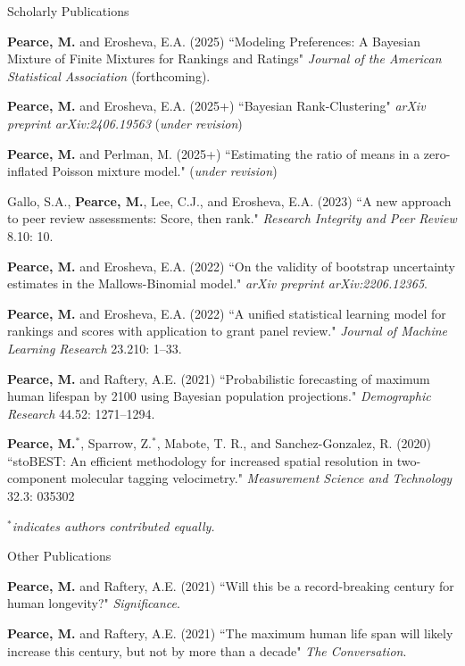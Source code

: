 \documentclass{resume} %
\begin{document}
\begin{rSection}{Scholarly Publications}

\textbf{Pearce, M.} and Erosheva, E.A. (2025) ``Modeling Preferences: A Bayesian Mixture of Finite Mixtures for Rankings and Ratings" \textit{Journal of the American Statistical Association} (forthcoming).

\textbf{Pearce, M.} and Erosheva, E.A. (2025+) ``Bayesian Rank-Clustering" \textit{arXiv preprint arXiv:2406.19563} (\textit{under revision})

\textbf{Pearce, M.} and Perlman, M. (2025+) ``Estimating the ratio of means in a zero-inflated Poisson mixture model." (\textit{under revision})

Gallo, S.A., \textbf{Pearce, M.}, Lee, C.J., and Erosheva, E.A. (2023) ``A new approach to peer review assessments: Score, then rank." \textit{Research Integrity and Peer Review} 8.10: 10.

\textbf{Pearce, M.} and Erosheva, E.A. (2022) ``On the validity of bootstrap uncertainty estimates in the Mallows-Binomial model." \textit{arXiv preprint arXiv:2206.12365}.

\textbf{Pearce, M.} and Erosheva, E.A. (2022) ``A unified statistical learning model for rankings and scores with application to grant panel review." \textit{Journal of Machine Learning Research} 23.210: 1--33.

\textbf{Pearce, M.} and Raftery, A.E. (2021) ``Probabilistic forecasting of maximum human lifespan by 2100 using Bayesian population projections." {\em Demographic Research} 44.52: 1271--1294.

\textbf{Pearce, M.}$^*$, Sparrow, Z.$^*$, Mabote, T. R., and Sanchez-Gonzalez, R. (2020) ``stoBEST: An efficient methodology for increased spatial resolution in two-component molecular tagging velocimetry." {\em Measurement Science and Technology} 32.3: 035302

{\em $^*$indicates authors contributed equally.}
\end{rSection}

\begin{rSection}{Other Publications}

\textbf{Pearce, M.} and Raftery, A.E. (2021) ``Will this be a record-breaking century for human longevity?" {\em Significance}.

\textbf{Pearce, M.} and Raftery, A.E. (2021) ``The maximum human life span will likely increase this century, but not by more than a decade" {\em The Conversation}.

\end{rSection}
\end{document}
